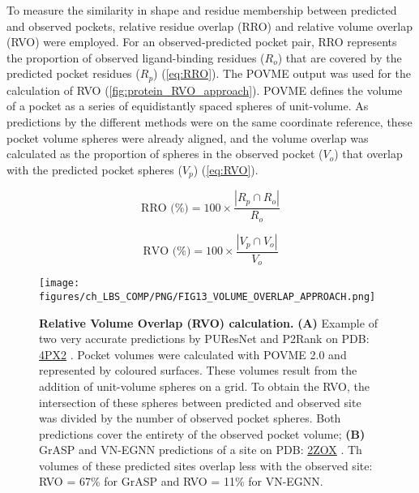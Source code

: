 To measure the similarity in shape and residue membership between predicted and observed pockets, relative residue overlap (RRO) and relative volume overlap (RVO) were employed. For an observed-predicted pocket pair, RRO represents the proportion of observed ligand-binding residues ($R_{o}$) that are covered by the predicted pocket residues ($R_{p}$) (\autoref{eq:RRO}). The POVME output was used for the calculation of RVO (\autoref{fig:protein_RVO_approach}). POVME defines the volume of a pocket as a series of equidistantly spaced spheres of unit-volume. As predictions by the different methods were on the same coordinate reference, these pocket volume spheres were already aligned, and the volume overlap was calculated as the proportion of spheres in the observed pocket ($V_{o}$) that overlap with the predicted pocket spheres ($V_{p}$) (\autoref{eq:RVO}).

\begin{equation}
\text{RRO (\%)} = 100 \times \frac{|R_p \cap R_o|}{R_o}
\label{eq:RRO}
\end{equation}

\vspace{-12pt} %

\begin{equation}
\text{RVO (\%)} = 100 \times \frac{|V_p \cap V_o|}{V_o}
\label{eq:RVO}
\end{equation}

\begin{figure}[p]
    \centering
    \texttt{[image: figures/ch\_LBS\_COMP/PNG/FIG13\_VOLUME\_OVERLAP\_APPROACH.png]}
    \caption[Relative Volume Overlap (RVO) calculation]{\textbf{Relative Volume Overlap (RVO) calculation.} \textbf{(A)} Example of two very accurate predictions by PUResNet and P2Rank on PDB: \href{https://www.ebi.ac.uk/pdbe/entry/pdb/4px2}{4PX2} \cite{PDB_4PX2}. Pocket volumes were calculated with POVME 2.0 and represented by coloured surfaces. These volumes result from the addition of unit-volume spheres on a grid. To obtain the RVO, the intersection of these spheres between predicted and observed site was divided by the number of observed pocket spheres. Both predictions cover the entirety of the observed pocket volume; \textbf{(B)} GrASP and VN-EGNN predictions of a site on PDB: \href{https://www.ebi.ac.uk/pdbe/entry/pdb/2ZOX}{2ZOX} \cite{NOGUCHI_2008_STRUCTURE}. Th volumes of these predicted sites overlap less with the observed site: RVO = 67\% for GrASP and RVO = 11\% for VN-EGNN.}
    \label{fig:protein_RVO_approach}
\end{figure}

